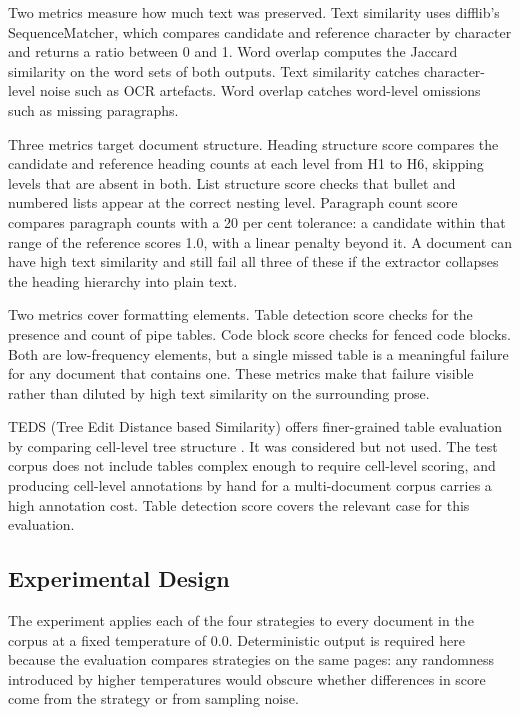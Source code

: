 \documentclass[12pt]{article}
\begin{document}
Two metrics measure how much text was preserved. Text similarity uses
difflib's SequenceMatcher, which compares candidate and reference character
by character and returns a ratio between 0 and 1. Word overlap computes
the Jaccard similarity on the word sets of both outputs. Text similarity
catches character-level noise such as OCR artefacts. Word overlap catches
word-level omissions such as missing paragraphs.

Three metrics target document structure. Heading structure score compares
the candidate and reference heading counts at each level from H1 to H6,
skipping levels that are absent in both. List structure score checks that
bullet and numbered lists appear at the correct nesting level. Paragraph
count score compares paragraph counts with a 20 per cent tolerance: a
candidate within that range of the reference scores 1.0, with a linear
penalty beyond it. A document can have high text similarity and still fail
all three of these if the extractor collapses the heading hierarchy into
plain text.

Two metrics cover formatting elements. Table detection score checks for the
presence and count of pipe tables. Code block score checks for fenced code
blocks. Both are low-frequency elements, but a single missed table is a
meaningful failure for any document that contains one. These metrics make
that failure visible rather than diluted by high text similarity on the
surrounding prose.

TEDS (Tree Edit Distance based Similarity) offers finer-grained table
evaluation by comparing cell-level tree structure \cite{zhong2020}. It was
considered but not used. The test corpus does not include tables complex
enough to require cell-level scoring, and producing cell-level annotations
by hand for a multi-document corpus carries a high annotation cost.
Table detection score covers the relevant case for this evaluation.

\subsection{Experimental Design}

The experiment applies each of the four strategies to every document in
the corpus at a fixed temperature of 0.0. Deterministic output is
required here because the evaluation compares strategies on the same
pages: any randomness introduced by higher temperatures would obscure
whether differences in score come from the strategy or from sampling
noise.
\end{document}

